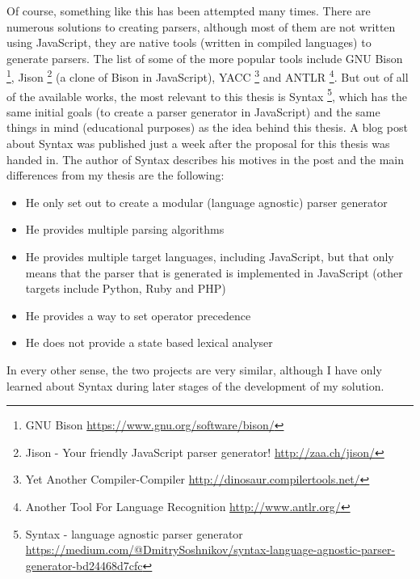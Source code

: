 Of course, something like this has been attempted many times. There are numerous solutions to creating parsers, although most of them are not written using JavaScript, they are native tools (written in compiled languages) to generate parsers. The list of some of the more popular tools include GNU Bison \footnote{GNU Bison \url{https://www.gnu.org/software/bison/}}, Jison \footnote{Jison - Your friendly JavaScript parser generator! \url{http://zaa.ch/jison/}} (a clone of Bison in JavaScript), YACC \footnote{Yet Another Compiler-Compiler \url{http://dinosaur.compilertools.net/}} and ANTLR \footnote{Another Tool For Language Recognition \url{http://www.antlr.org/}}. But out of all of the available works, the most relevant to this thesis is Syntax \footnote{Syntax - language agnostic parser generator \url{https://medium.com/@DmitrySoshnikov/syntax-language-agnostic-parser-generator-bd24468d7cfc}}, which has the same initial goals (to create a parser generator in JavaScript) and the same things in mind (educational purposes) as the idea behind this thesis. A blog post about Syntax was published just a week after the proposal for this thesis was handed in. The author of Syntax describes his motives in the post and the main differences from my thesis are the following:
\begin{itemize}
\item He only set out to create a modular (language agnostic) parser generator
\item He provides multiple parsing algorithms
\item He provides multiple target languages, including JavaScript, but that only means that the parser that is generated is implemented in JavaScript (other targets include Python, Ruby and PHP)
\item He provides a way to set operator precedence
\item He does not provide a state based lexical analyser
\end{itemize}
In every other sense, the two projects are very similar, although I have only learned about Syntax during later stages of the development of my solution.

